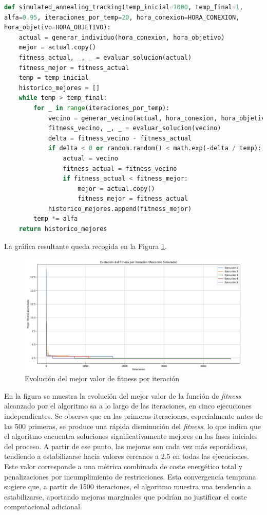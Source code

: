 \documentclass[11pt,a4paper]{book}
\begin{document}
\begin{lstlisting}[language=Python, caption={Convergencia del algoritmo de Recocido Simulado}, label={lst:test}]
def simulated_annealing_tracking(temp_inicial=1000, temp_final=1, 
alfa=0.95, iteraciones_por_temp=20, hora_conexion=HORA_CONEXION, 
hora_objetivo=HORA_OBJETIVO):
    actual = generar_individuo(hora_conexion, hora_objetivo)
    mejor = actual.copy()
    fitness_actual, _, _ = evaluar_solucion(actual)
    fitness_mejor = fitness_actual
    temp = temp_inicial
    historico_mejores = []
    while temp > temp_final:
        for _ in range(iteraciones_por_temp):
            vecino = generar_vecino(actual, hora_conexion, hora_objetivo)
            fitness_vecino, _, _ = evaluar_solucion(vecino)
            delta = fitness_vecino - fitness_actual
            if delta < 0 or random.random() < math.exp(-delta / temp):
                actual = vecino
                fitness_actual = fitness_vecino
                if fitness_actual < fitness_mejor:
                    mejor = actual.copy()
                    fitness_mejor = fitness_actual
            historico_mejores.append(fitness_mejor)
        temp *= alfa
    return historico_mejores
\end{lstlisting}

La gráfica resultante queda recogida en la Figura \ref{fig:convergencia}.

\begin{figure}[H]
    \centering
    \includegraphics[width=1.1\linewidth]{fig/convergencia.png}
    \caption{Evolución del mejor valor de fitness por iteración}
    \label{fig:convergencia}
\end{figure}

En la figura se muestra la evolución del mejor valor de la función de \textit{fitness} alcanzado por el algoritmo \gls{sa} a lo largo de las iteraciones, en cinco ejecuciones independientes. Se observa que en las primeras iteraciones, especialmente antes de las 500 primeras, se produce una rápida disminución del \textit{fitness}, lo que indica que el algoritmo encuentra soluciones significativamente mejores en las fases iniciales del proceso. A partir de ese punto, las mejoras son cada vez más esporádicas, tendiendo a estabilizarse hacia valores cercanos a 2.5 en todas las ejecuciones. Este valor corresponde a una métrica combinada de coste energético total y penalizaciones por incumplimiento de restricciones. Esta convergencia temprana sugiere que, a partir de 1500 iteraciones, el algoritmo muestra una tendencia a estabilizarse, aportando mejoras marginales que podrían no justificar el coste computacional adicional.
\end{document}
